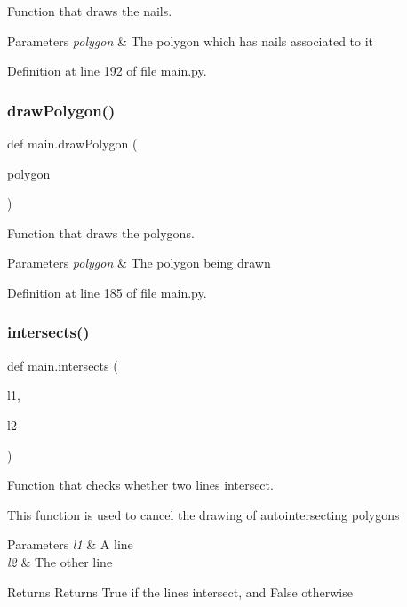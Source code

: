Function that draws the nails. 


\begin{DoxyParams}{Parameters}
{\em polygon} & The polygon which has nails associated to it \\
\hline
\end{DoxyParams}


Definition at line 192 of file main.\+py.

\mbox{\label{namespacemain_a923e8cecbed43bf133611a409c40c107}} 
\subsubsection{\texorpdfstring{draw\+Polygon()}{drawPolygon()}}
{\footnotesize\ttfamily def main.\+draw\+Polygon (\begin{DoxyParamCaption}\item[{}]{polygon }\end{DoxyParamCaption})}



Function that draws the polygons. 


\begin{DoxyParams}{Parameters}
{\em polygon} & The polygon being drawn \\
\hline
\end{DoxyParams}


Definition at line 185 of file main.\+py.

\mbox{\label{namespacemain_afa0ac21cfc8ed3c2c3cfddd6ea6899b6}} 
\subsubsection{\texorpdfstring{intersects()}{intersects()}}
{\footnotesize\ttfamily def main.\+intersects (\begin{DoxyParamCaption}\item[{}]{l1,  }\item[{}]{l2 }\end{DoxyParamCaption})}



Function that checks whether two lines intersect. 

This function is used to cancel the drawing of autointersecting polygons 
\begin{DoxyParams}{Parameters}
{\em l1} & A line \\
\hline
{\em l2} & The other line \\
\hline
\end{DoxyParams}
\begin{DoxyReturn}{Returns}
Returns True if the lines intersect, and False otherwise 
\end{DoxyReturn}


